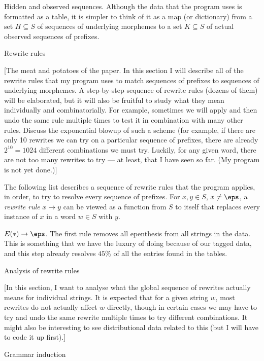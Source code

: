 \medskip\boldlabel Hidden and observed sequences.
Although the data that the program uses is formatted as a table, it is simpler to think of it as a map (or
dictionary) from a set $H\subseteq S$ of sequences of underlying morphemes to a set $K\subseteq S$
of actual observed sequences of prefixes.

\advsect Rewrite rules

[The meat and potatoes of the paper. In this section I will describe all of the rewrite rules that my program
uses to match sequences of prefixes to sequences of underlying morphemes. A step-by-step sequence of rewrite
rules (dozens of them) will be elaborated, but it will also be fruitful to study what they mean individually
and combinatorially. For example, sometimes we will apply and then undo the same rule multiple times to
test it in combination with many other rules. Discuss the exponential blowup of such a scheme (for example,
if there are only 10 rewrites we can try on a particular sequence of prefixes, there are already $2^{10} = 1024$
different combinations we must try. Luckily, for any given word, there are not too many rewrites to try --- at
least, that I have seen so far. (My program is not yet done.)]

The following list describes a sequence of rewrite rules that the program applies, in order, to try to resolve
every sequence of prefixes. For $x,y\in S$, $x\neq\eps$, a
{\it rewrite rule} $x\to y$ can be viewed as a function from $S$ to itself that
replaces every instance of $x$ in a word $w\in S$ with $y$.

\medskip\resetnum
\numitem $\E{*}\to \eps$.
\medskip
The first rule removes all epenthesis from all strings in the data. This is something that we have the luxury
of doing because of our tagged data, and this step already resolves $45\%$ of all the entries found in the tables.

\advsect Analysis of rewrite rules

[In this section, I want to analyse what the global sequence of rewrites actually means for individual strings.
It is expected that for a given string $w$, most rewrites do not actually affect $w$ directly, though
in certain cases we may have to try and undo the same rewrite multiple times to try different combinations.
It might also be interesting to see distributional data related to this (but I will have to code it up first).]

\advsect Grammar induction

